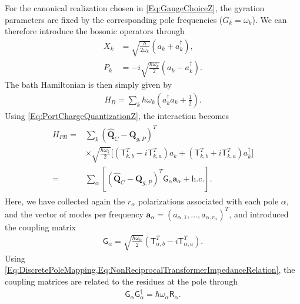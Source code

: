 \documentclass[prx,aps,twocolumn,article]{revtex4-2}
\newcommand{\msf}[1]{\mathsf{#1}}
\newcommand{\bsb}[1]{\boldsymbol{#1}}
\newcommand{\bQ}{\bsb{Q}}
\newcommand{\ba}{\bsb{a}}
\newcommand{\msT}{\msf{T}}
\newcommand{\msG}{\msf{G}}
\newcommand{\msR}{\msf{R}}
\begin{document}
For the canonical realization chosen in \cref{Eq:GaugeChoiceZ},
the gyration parameters are fixed by the corresponding pole
frequencies ($G_k=\omega_k$). We can therefore introduce the bosonic
operators through
\begin{align}
    X_k
    &=
    \sqrt{\frac{\hbar}{2\omega_k}}
    \left(
        a_k+a_k^\dag
    \right),
    \nonumber\\
    P_k
    &=
    -i\sqrt{\frac{\hbar\omega_k}{2}}
    \left(
        a_k-a_k^\dag
    \right).
\end{align}
The bath Hamiltonian is then simply given by
\begin{align}
    H_B
    =
    \sum_k
    \hbar\omega_k
    \left(
        a_k^\dag
        a_k
        +
        \frac{1}{2}
    \right).
\end{align}
Using \cref{Eq:PortChargeQuantizationZ}, the interaction becomes
\begin{align}
\begin{aligned}
    H_{PB}
    =&
    \sum_k
    \left(
        \hat{\bQ}_C-\bQ_{g,P}
    \right)^T 
    \\&\times
    \sqrt{
        \frac{\hbar\omega_k}{2}
    }
    \bigg[
        \left(
            \msT_{k,b}^T
            -
            i\msT_{k,a}^T
        \right)
        a_k+
        \left(
            \msT_{k,b}^T
            +
            i\msT_{k,a}^T
        \right)
        a_k^\dag
    \bigg]
    \\
    =&
    \sum_\alpha
    \left[
        \left(
            \hat{\bQ}_C-\bQ_{g,P}
        \right)^T
        \msG_\alpha\ba_\alpha
        +
        \mathrm{h.c.}
    \right].
\end{aligned}
\end{align}
Here, we have collected again the $r_\alpha$ polarizations associated with each pole $\alpha$, and the vector of modes per frequency
$\ba_\alpha=(a_{\alpha,1},\ldots,a_{\alpha,r_\alpha})^T$, 
and introduced the coupling matrix
\begin{align}
    \msG_\alpha
    =
    \sqrt{
        \frac{\hbar\omega_\alpha}{2}
    }
    \left(
        \msT_{\alpha,b}^T
        -
        i\msT_{\alpha,a}^T
    \right).
    \label{Eq:NRCoupling}
\end{align}
Using \cref{Eq:DiscretePoleMapping,Eq:NonReciprocalTransformerImpedanceRelation}, the coupling matrices are related to the residues at the pole through
\begin{align}
    \msG_\alpha\msG_\alpha^\dag
    =
    \hbar\omega_\alpha\msR_\alpha.
\end{align}
\end{document}
